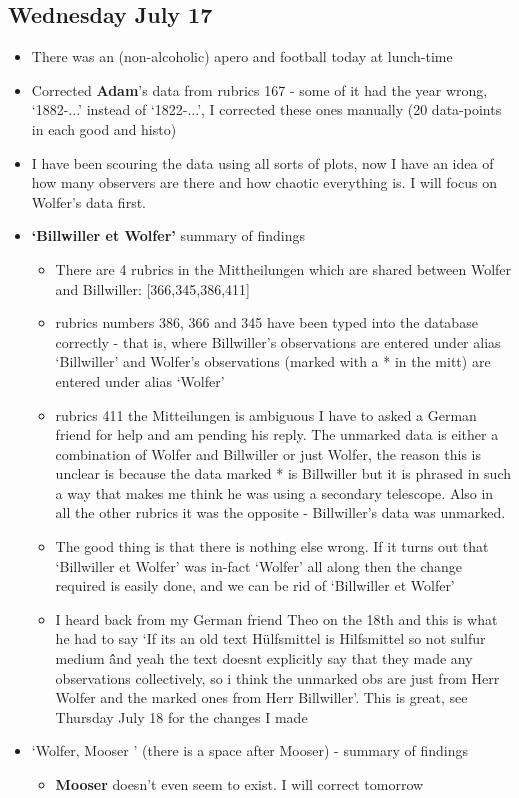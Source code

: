 \documentclass[12pt]{article}
\begin{document}
\subsection{Wednesday July 17}
\begin{itemize}
    \item There was an (non-alcoholic) apero and football today at lunch-time
    \item Corrected \textbf{Adam}'s data from rubrics 167 - some of it had the year wrong, `1882-...' instead of `1822-...', I corrected these ones manually (20 data-points in each good and histo)
    \item I have been scouring the data using all sorts of plots, now I have an idea of how many observers are there and how chaotic everything is. I will focus on Wolfer's data first.
    \item \textbf{`Billwiller et Wolfer'} summary of findings
    \begin{itemize}
        \item There are 4 rubrics in the Mittheilungen which are shared between Wolfer and Billwiller: [366,345,386,411]
        \item rubrics numbers 386, 366 and 345 have been typed into the database correctly - that is, where Billwiller's observations are entered under alias `Billwiller' and Wolfer's observations (marked with a * in the mitt) are entered under alias `Wolfer'
        \item rubrics 411 the Mitteilungen is ambiguous I have to asked a German friend for help and am pending his reply. The unmarked data is either a combination of Wolfer and Billwiller or just Wolfer, the reason this is unclear is because the data marked * is Billwiller but it is phrased in such a way that makes me think he was using a secondary telescope. Also in all the other rubrics it was the opposite - Billwiller's data was unmarked.
        \item The good thing is that there is nothing else wrong. If it turns out that `Billwiller et Wolfer' was in-fact `Wolfer' all along then the change required is easily done, and we can be rid of `Billwiller et Wolfer'
        \item I heard back from my German friend Theo on the 18th and this is what he had to say `If its an old text Hülfsmittel is Hilfsmittel so not sulfur medium \^\^ and yeah the text doesnt explicitly say that they made any observations collectively, so i think the unmarked obs are just from Herr Wolfer and the marked ones from Herr Billwiller'. This is great, see Thursday July 18 for the changes I made
    \end{itemize}
    \item `Wolfer, Mooser ' (there is a space after Mooser) - summary of findings
    \begin{itemize}
        \item \textbf{Mooser} doesn't even seem to exist. I will correct tomorrow
        

\end{itemize}
\end{itemize}
\end{document}
